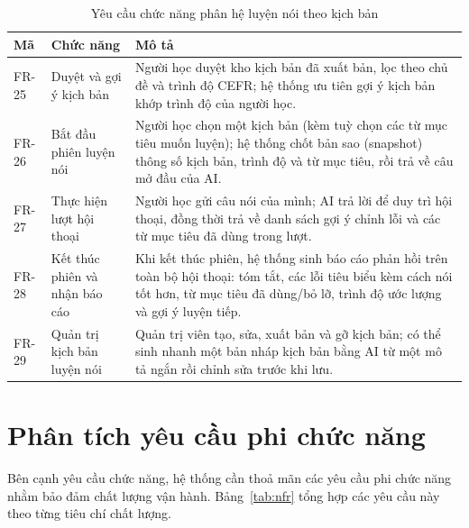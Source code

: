 \begin{table}[h]
  \centering
  \small
  \renewcommand{\arraystretch}{1.3}
  \begin{tabular}{|p{1.7cm}|p{3.4cm}|p{9.4cm}|}
    \hline
    \textbf{Mã} & \textbf{Chức năng} & \textbf{Mô tả} \\
    \hline
    FR-25 & Duyệt và gợi ý kịch bản & Người học duyệt kho kịch bản đã xuất bản, lọc theo chủ đề và trình độ CEFR; hệ thống ưu tiên gợi ý kịch bản khớp trình độ của người học. \\
    \hline
    FR-26 & Bắt đầu phiên luyện nói & Người học chọn một kịch bản (kèm tuỳ chọn các từ mục tiêu muốn luyện); hệ thống chốt bản sao (snapshot) thông số kịch bản, trình độ và từ mục tiêu, rồi trả về câu mở đầu của AI. \\
    \hline
    FR-27 & Thực hiện lượt hội thoại & Người học gửi câu nói của mình; AI trả lời để duy trì hội thoại, đồng thời trả về danh sách gợi ý chỉnh lỗi và các từ mục tiêu đã dùng trong lượt. \\
    \hline
    FR-28 & Kết thúc phiên và nhận báo cáo & Khi kết thúc phiên, hệ thống sinh báo cáo phản hồi trên toàn bộ hội thoại: tóm tắt, các lỗi tiêu biểu kèm cách nói tốt hơn, từ mục tiêu đã dùng/bỏ lỡ, trình độ ước lượng và gợi ý luyện tiếp. \\
    \hline
    FR-29 & Quản trị kịch bản luyện nói & Quản trị viên tạo, sửa, xuất bản và gỡ kịch bản; có thể sinh nhanh một bản nháp kịch bản bằng AI từ một mô tả ngắn rồi chỉnh sửa trước khi lưu. \\
    \hline
  \end{tabular}
  \caption{Yêu cầu chức năng phân hệ luyện nói theo kịch bản}
  \label{tab:fr-speaking}
\end{table}

\section{Phân tích yêu cầu phi chức năng}
\label{sec:yeu-cau-phi-chuc-nang}

Bên cạnh yêu cầu chức năng, hệ thống cần thoả mãn các yêu cầu phi chức năng
nhằm bảo đảm chất lượng vận hành. Bảng~\ref{tab:nfr} tổng hợp các yêu cầu
này theo từng tiêu chí chất lượng.

